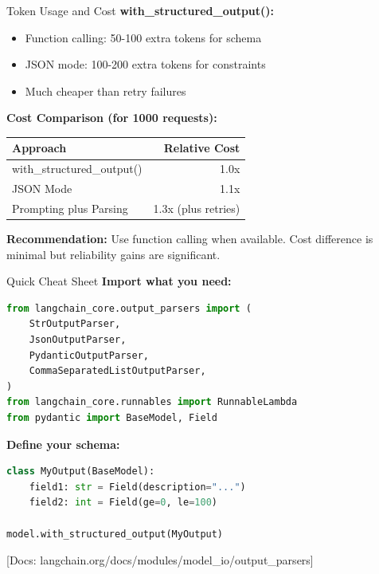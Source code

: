 \documentclass[aspectratio=169,11pt]{beamer}
\newcommand{\docref}[1]{{\scriptsize\color{docgray}[Docs: #1]}}
\begin{document}
\begin{frame}{Token Usage and Cost}
\textbf{with\_structured\_output():}
\begin{itemize}
  \setlength{\itemsep}{1pt}
  \item Function calling: 50-100 extra tokens for schema
  \item JSON mode: 100-200 extra tokens for constraints
  \item Much cheaper than retry failures
\end{itemize}

\vspace{0.08cm}

\textbf{Cost Comparison (for 1000 requests):}

\begin{center}
\begin{tabular}{|l|r|}
\hline
\textbf{Approach} & \textbf{Relative Cost} \\
\hline
with\_structured\_output() & 1.0x \\
\hline
JSON Mode & 1.1x \\
\hline
Prompting plus Parsing & 1.3x (plus retries) \\
\hline
\end{tabular}
\end{center}

\vspace{0.1cm}

\textbf{Recommendation:} Use function calling when available. Cost difference is minimal but reliability gains are significant.
\end{frame}

\begin{frame}[fragile]{Quick Cheat Sheet}
\textbf{Import what you need:}
\begin{lstlisting}[language=Python]
from langchain_core.output_parsers import (
    StrOutputParser,
    JsonOutputParser,
    PydanticOutputParser,
    CommaSeparatedListOutputParser,
)
from langchain_core.runnables import RunnableLambda
from pydantic import BaseModel, Field
\end{lstlisting}

\vspace{0.1cm}

\textbf{Define your schema:}
\begin{lstlisting}[language=Python]
class MyOutput(BaseModel):
    field1: str = Field(description="...")
    field2: int = Field(ge=0, le=100)

model.with_structured_output(MyOutput)
\end{lstlisting}

\docref{langchain.org/docs/modules/model\_io/output\_parsers}
\end{frame}
\end{document}
